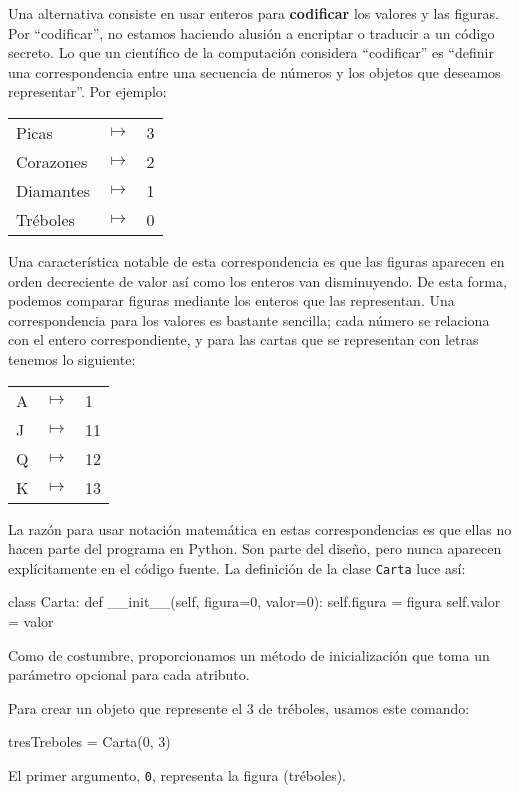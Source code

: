   

Una alternativa consiste en usar enteros para \textbf{codificar} los
valores y las figuras. Por ``codificar'', no estamos haciendo alusión
a encriptar o traducir a un código secreto. Lo que un científico de
la computación considera ``codificar'' es ``definir una correspondencia
entre una secuencia de números y los objetos que deseamos representar''.
Por ejemplo:

\beforefig %
\begin{tabular}{lcl}
Picas  & $\mapsto$  & 3 \tabularnewline
Corazones  & $\mapsto$  & 2 \tabularnewline
Diamantes  & $\mapsto$  & 1 \tabularnewline
Tréboles  & $\mapsto$  & 0 \tabularnewline
\end{tabular}\afterfig

Una característica notable de esta correspondencia es que las figuras
aparecen en orden decreciente de valor así como los enteros van disminuyendo.
De esta forma, podemos comparar figuras mediante los enteros que las
representan. Una correspondencia para los valores es bastante sencilla;
cada número se relaciona con el entero correspondiente, y para las
cartas que se representan con letras tenemos lo siguiente:

\beforefig %
\begin{tabular}{lcl}
A  & $\mapsto$  & 1 \tabularnewline
J  & $\mapsto$  & 11 \tabularnewline
Q  & $\mapsto$  & 12 \tabularnewline
K  & $\mapsto$  & 13 \tabularnewline
\end{tabular}\afterfig

La razón para usar notación matemática en estas correspondencias es
que ellas no hacen parte del programa en Python. Son parte del diseño,
pero nunca aparecen explícitamente en el código fuente. La definición
de la clase \texttt{Carta} luce así:
\begin{pythoncode}
class Carta:
  def __init__(self, figura=0, valor=0):
    self.figura = figura
    self.valor = valor
\end{pythoncode}
 Como de costumbre, proporcionamos un método de inicialización que
toma un parámetro opcional para cada atributo.


Para crear un objeto que represente el 3 de tréboles, usamos este
comando:
\begin{pythoncode}
tresTreboles = Carta(0, 3)
\end{pythoncode}

El primer argumento, \texttt{0}, representa la figura (tréboles).

